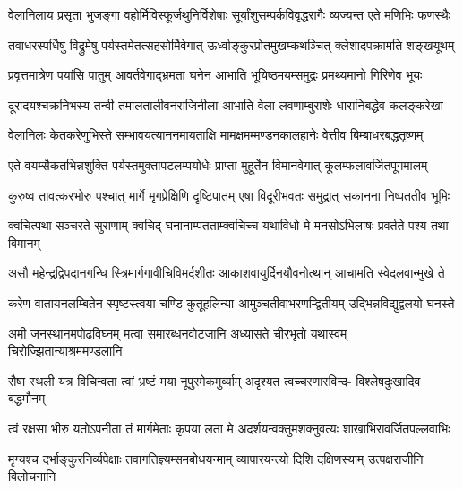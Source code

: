 \fourlineindentedshloka
{वेलानिलाय प्रसृता भुजङ्गा}
{वहोर्मिविस्फूर्जथुनिर्विशेषाः}
{सूर्यांशुसम्पर्कविवृद्धरागैः}
{व्यज्यन्त एते मणिभिः फणस्थैः} %

\fourlineindentedshloka
{तवाधरस्पर्धिषु विद्रुमेषु}
{पर्यस्तमेतत्सहसोर्मिवेगात्}
{ऊर्ध्वाङ्कुरप्रोतमुखम्कथञ्चित्}
{क्लेशादपक्रामति शङ्खयूथम्} %

\fourlineindentedshloka
{प्रवृत्तमात्रेण पयांसि पातुम्}
{आवर्तवेगाद्भ्रमता घनेन}
{आभाति भूयिष्ठमयम्समुद्रः}
{प्रमथ्यमानो गिरिणेव भूयः} %

\fourlineindentedshloka
{दूरादयश्चक्रनिभस्य तन्वी}
{तमालतालीवनराजिनीला}
{आभाति वेला लवणाम्बुराशेः}
{धारानिबद्धेव कलङ्करेखा} %

\fourlineindentedshloka
{वेलानिलः केतकरेणुभिस्ते}
{सम्भावयत्याननमायताक्षि}
{मामक्षमम्मण्डनकालहानेः}
{वेत्तीव बिम्बाधरबद्धतृष्णम्} %

\fourlineindentedshloka
{एते वयम्सैकतभिन्नशुक्ति}
{पर्यस्तमुक्तापटलम्पयोधेः}
{प्राप्ता मुहूर्तेन विमानवेगात्}
{कूलम्फलावर्जितपूगमालम्} %

\fourlineindentedshloka
{कुरुष्व तावत्करभोरु पश्चात्}
{मार्गे मृगप्रेक्षिणि दृष्टिपातम्}
{एषा विदूरीभवतः समुद्रात्}
{सकानना निष्पततीव भूमिः} %

\fourlineindentedshloka
{क्वचित्पथा सञ्चरते सुराणाम्}
{क्वचिद् घनानाम्पतताम्क्वचिच्च}
{यथाविधो मे मनसोऽभिलाषः}
{प्रवर्तते पश्य तथा विमानम्} %

\fourlineindentedshloka
{असौ महेन्द्रद्विपदानगन्धि}
{स्त्रिमार्गगावीचिविमर्दशीतः}
{आकाशवायुर्दिनयौवनोत्थान्}
{आचामति स्वेदलवान्मुखे ते} %

\fourlineindentedshloka
{करेण वातायनलम्बितेन}
{स्पृष्टस्त्वया चण्डि कुतूहलिन्या}
{आमुञ्चतीवाभरणम्द्वितीयम्}
{उद्भिन्नविद्युद्वलयो घनस्ते} %

\fourlineindentedshloka
{अमी जनस्थानमपोढविघ्नम्}
{मत्वा समारब्धनवोटजानि}
{अध्यासते चीरभृतो यथास्वम्}
{चिरोज्झितान्याश्रममण्डलानि} %

\fourlineindentedshloka
{सैषा स्थली यत्र विचिन्वता त्वां}
{भ्रष्टं मया नूपुरमेकमुर्व्याम्}
{अदृश्यत त्वच्चरणारविन्द-}
{विश्लेषदुःखादिव बद्धमौनम्} %

\fourlineindentedshloka
{त्वं रक्षसा भीरु यतोऽपनीता}
{तं मार्गमेताः कृपया लता मे}
{अदर्शयन्वक्तुमशक्नुवत्यः}
{शाखाभिरावर्जितपल्लवाभिः} %

\fourlineindentedshloka
{मृग्यश्च दर्भाङ्कुरनिर्व्यपेक्षाः}
{तवागतिज्ञ्यम्समबोधयन्माम्}
{व्यापारयन्त्यो दिशि दक्षिणस्याम्}
{उत्पक्षराजीनि विलोचनानि} %

